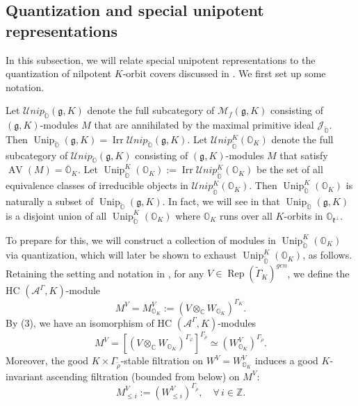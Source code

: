 \documentclass[11pt, a4paper]{amsart}
\newcommand{\C}{\mathbb{C}}
\newcommand{\A}{\mathcal{A}}
\newcommand{\J}{\mathcal{J}}
\newcommand{\g}{\mathfrak{g}}
\newcommand{\orb}{\mathbb{O}}
\newcommand{\orbk}{\orb_{K}}
\newcommand{\Z}{\mathbb{Z}}
\newcommand{\fk}{\mathfrak{k}}
\newcommand{\ckorb}{\check{\orb}}
\newcommand{\cM}{\mathcal{M}}
\newcommand{\WV}{W^{\scriptscriptstyle V}}
\newcommand{\MV}{M^{\scriptscriptstyle V}}
\newcommand{\MgK}{\cM_f(\g,K)}
\newcommand{\tGamma}{\widetilde{\Gamma}}
\DeclareMathOperator{\AV}{AV}
\DeclareMathOperator{\Unip}{Unip}
\DeclareMathOperator{\Rep}{Rep}
\newcommand{\UnipOv}{\Unip_{\ckorb}}
\newcommand{\cUnipOv}{\mathcal{U}nip_{\ckorb}}
\newcommand{\Irr}{\operatorname{Irr}}
\theoremstyle{definition}
\numberwithin{equation}{section}
\begin{document}
\subsection{Quantization and special unipotent representations} \label{subsec:quant_unip}

In this subsection, we will relate special unipotent representations to the quantization of nilpotent $K$-orbit covers discussed in . We first set up some notation.

Let $\cUnipOv(\g,K)$ denote the full subcategory of $\MgK$ consisting of $(\g,K)$-modules $M$ that are annihilated by the maximal primitive ideal $\J_{\ckorb}$. Then $\UnipOv(\g,K) = \Irr \cUnipOv(\g,K)$. Let $\cUnipOv^K(\orbk)$ denote the full subcategory of $\cUnipOv(\g,K)$ consisting of $(\g,K)$-modules $M$ that satisfy $\AV(M) = \overline{\orb}_K$. Let $\UnipOv^K(\orbk) := \Irr \cUnipOv^K(\orbk)$ be the set of all equivalence classes of irreducible objects in $\cUnipOv^K(\orbk)$. Then $\UnipOv^K(\orbk)$ is naturally a subset of $\UnipOv(\g,K)$. In fact, we will see in  that $\UnipOv(\g,K)$ is a disjoint union of all $\UnipOv^K(\orbk)$ where $\orbk$ runs over all $K$-orbits in $\orb_{\fk^\perp}$. 

To prepare for this, we will construct a collection of modules in $\UnipOv^K(\orbk)$ via quantization, which will later be shown to exhaust $\UnipOv^K(\orbk)$, as follows.
Retaining the setting and notation in , for any $V \in \Rep(\tGamma_K)^{gen}$, we define the HC $(\A^\Gamma, K)$-module
\begin{equation} \label{eq:EV}
    \MV = \MV_{\orbk} := (V \otimes_\C W_{\orbk})^{\Gamma_K}.
\end{equation} 
By (3), we have an isomorphism of HC $(\A^\Gamma, K)$-modules
\begin{equation} \label{eq:MV_WV}
	\MV = [(V \otimes_\C W_{\orbk})^{\Gamma_\varphi}]^{\Gamma_{\tilde{\rho}}} \simeq (\WV_{\orbk})^{\Gamma_{\tilde{\rho}}}.
\end{equation}
Moreover, the good $K \times \Gamma_{\tilde{\rho}}$-stable filtration on $\WV = \WV_{\orbk}$ induces a good $K$-invariant ascending filtration (bounded from below) on $\MV$:
	\[ \MV_{\leqslant i} := (\WV_{\leqslant i})^{\Gamma_{\tilde{\rho}}}, \quad \forall \, i \in \Z. \]
\end{document}
